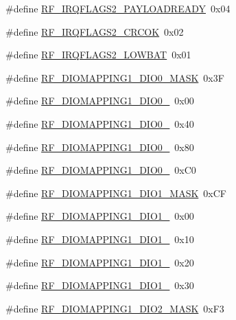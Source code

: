 \begin{DoxyCompactItemize}
\item 
\#define \hyperlink{sx1276Regs-Fsk_8h_a31da28dd399ab411a7f35f1c3d5295a8}{R\+F\+\_\+\+I\+R\+Q\+F\+L\+A\+G\+S2\+\_\+\+P\+A\+Y\+L\+O\+A\+D\+R\+E\+A\+DY}~0x04
\item 
\#define \hyperlink{sx1276Regs-Fsk_8h_a55a4b43de7fb4852a6ffe0cf6eee98f7}{R\+F\+\_\+\+I\+R\+Q\+F\+L\+A\+G\+S2\+\_\+\+C\+R\+C\+OK}~0x02
\item 
\#define \hyperlink{sx1276Regs-Fsk_8h_a2849a01d5fe3f3476fb31a7ac8e5e34a}{R\+F\+\_\+\+I\+R\+Q\+F\+L\+A\+G\+S2\+\_\+\+L\+O\+W\+B\+AT}~0x01
\item 
\#define \hyperlink{sx1276Regs-Fsk_8h_a9be88c0f522b9fb1e8a43008a84cb4e5}{R\+F\+\_\+\+D\+I\+O\+M\+A\+P\+P\+I\+N\+G1\+\_\+\+D\+I\+O0\+\_\+\+M\+A\+SK}~0x3F
\item 
\#define \hyperlink{sx1276Regs-Fsk_8h_a848521495c2f6025a438a89cd4fe7943}{R\+F\+\_\+\+D\+I\+O\+M\+A\+P\+P\+I\+N\+G1\+\_\+\+D\+I\+O0\+\_}~0x00
\item 
\#define \hyperlink{sx1276Regs-Fsk_8h_a63c7ef74ba01cd3e1552814d638f32fd}{R\+F\+\_\+\+D\+I\+O\+M\+A\+P\+P\+I\+N\+G1\+\_\+\+D\+I\+O0\+\_}~0x40
\item 
\#define \hyperlink{sx1276Regs-Fsk_8h_abc31a276fae19b01be5eb3f8705cd793}{R\+F\+\_\+\+D\+I\+O\+M\+A\+P\+P\+I\+N\+G1\+\_\+\+D\+I\+O0\+\_}~0x80
\item 
\#define \hyperlink{sx1276Regs-Fsk_8h_a9ff81336dba9556766eab5557d307c61}{R\+F\+\_\+\+D\+I\+O\+M\+A\+P\+P\+I\+N\+G1\+\_\+\+D\+I\+O0\+\_}~0x\+C0
\item 
\#define \hyperlink{sx1276Regs-Fsk_8h_aa92615e9def963f8881f657746524eac}{R\+F\+\_\+\+D\+I\+O\+M\+A\+P\+P\+I\+N\+G1\+\_\+\+D\+I\+O1\+\_\+\+M\+A\+SK}~0x\+CF
\item 
\#define \hyperlink{sx1276Regs-Fsk_8h_abd43e3d4350c26e574afbde538b06ad6}{R\+F\+\_\+\+D\+I\+O\+M\+A\+P\+P\+I\+N\+G1\+\_\+\+D\+I\+O1\+\_}~0x00
\item 
\#define \hyperlink{sx1276Regs-Fsk_8h_a0740d4eea50feddedcc9c16f2bea4b46}{R\+F\+\_\+\+D\+I\+O\+M\+A\+P\+P\+I\+N\+G1\+\_\+\+D\+I\+O1\+\_}~0x10
\item 
\#define \hyperlink{sx1276Regs-Fsk_8h_aa3a59a62b71ccad95afea471eb8d51b2}{R\+F\+\_\+\+D\+I\+O\+M\+A\+P\+P\+I\+N\+G1\+\_\+\+D\+I\+O1\+\_}~0x20
\item 
\#define \hyperlink{sx1276Regs-Fsk_8h_a5c6e8e60356b10f7742d5dc73ddd03af}{R\+F\+\_\+\+D\+I\+O\+M\+A\+P\+P\+I\+N\+G1\+\_\+\+D\+I\+O1\+\_}~0x30
\item 
\#define \hyperlink{sx1276Regs-Fsk_8h_a428631edbba8ef725a4a6b3be1b6fb8a}{R\+F\+\_\+\+D\+I\+O\+M\+A\+P\+P\+I\+N\+G1\+\_\+\+D\+I\+O2\+\_\+\+M\+A\+SK}~0x\+F3

\end{DoxyCompactItemize}
